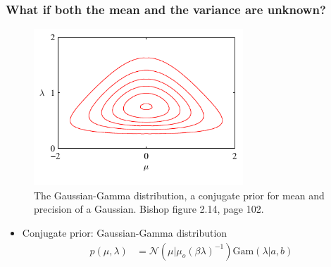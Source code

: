 \subsubsection{What if both the mean and the variance are unknown?}
\begin{figure}[h]
	\centering
		\includegraphics[width=0.7\textwidth]{./lecture4/Figure214.pdf}
		\caption{The Gaussian-Gamma distribution, a conjugate prior for mean and precision of a Gaussian. Bishop figure 2.14, page 102.}
\end{figure}    
\begin{itemize}
\item Conjugate prior: Gaussian-Gamma distribution
\begin{align}
p(\mu,\lambda) & = \mathcal{N}\left(\mu |\mu_o (\beta\lambda)^{-1}\right) \mbox{Gam}(\lambda|a,b)
\end{align}
\end{itemize}
